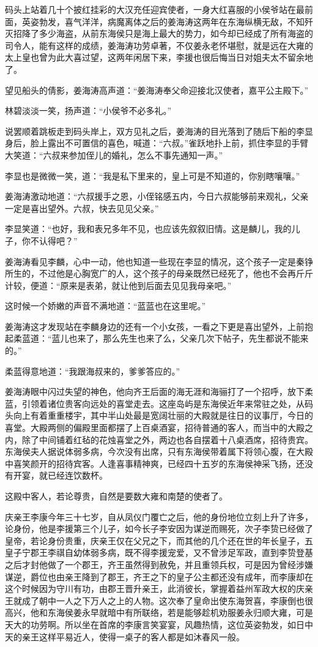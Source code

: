 码头上站着几十个披红挂彩的大汉充任迎宾使者，一身大红喜服的小侯爷站在最前面，英姿勃发，喜气洋洋，病魔离体之后的姜海涛这两年在东海纵横无敌，不知歼灭招降了多少海盗，从前东海侯只是海上最大的势力，如今却已经成了所有海盗的司令人，能有这样的成绩，姜海涛功劳卓著，不仅姜永老怀堪慰，就是远在大雍的太上皇也曾为此大喜过望，这两年闲居下来，李援也很后悔当日对姐夫太不留余地了。

望见船头的倩影，姜海涛高声道：“姜海涛奉父命迎接北汉使者，嘉平公主殿下。”

林碧淡淡一笑，扬声道：“小侯爷不必多礼。”

说罢顺着跳板走到码头岸上，双方见礼之后，姜海涛的目光落到了随后下船的李显身后，脸上露出不可置信的喜色，喊道：“六叔。”雀跃地扑上前，抓住李显的手臂大笑道：“六叔来参加侄儿的婚礼，怎么不事先通知一声。”

李显也是微微一笑，道：“我是私下里来的，皇上可是不知道的，你别瞎嚷嚷。”

姜海涛激动地道：“六叔援手之恩，小侄铭感五内，今日六叔能够前来观礼，父亲一定是喜出望外。六叔，快去见见父亲。”

李显笑道：“也好，我和表兄多年不见，也应该先叙叙旧情。这是麟儿，我的儿子，你不认得吧？”

姜海涛看见李麟，心中一动，他也知道一些现在李显的情况，这个孩子一定是秦铮所生的，不过他是心胸宽广的人，这个孩子的母亲既然已经死了，他也不会再斤斤计较，便道：“原来是表弟，就让他到后面去见见我母亲吧。”

这时候一个娇嫩的声音不满地道：“蓝蓝也在这里呢。”

姜海涛这才发现站在李麟身边的还有一个小女孩，一看之下更是喜出望外，上前抱起柔蓝道：“蓝儿也来了，那么先生也来了么，父亲几次下帖子，先生都说不能来的。”

柔蓝得意地道：“我跟海叔来的，爹爹答应的。”

姜海涛眼中闪过失望的神色，他向齐王后面的海无涯和海骊打了一个招呼，放下柔蓝，引领着诸位贵客向远处的喜堂走去。这座岛屿是东海侯近年来常驻之处，从码头向上有着重重楼宇，其中半山处最是宽阔壮丽的大殿就是往日的议事厅，今日的喜堂。大殿两侧的偏殿里面都摆了上百桌酒宴，招待普通的客人，而当中的大殿之内，除了中间铺着红毡的花烛喜堂之外，两边也各自摆着十八桌酒席，招待贵宾。东海侯夫人据说体弱多病，今次没有出席，只有东海侯带着属下将领心腹，在大殿中喜笑颜开的招待宾客。人逢喜事精神爽，已经四十五岁的东海侯神采飞扬，还没有开宴，就已经连饮数杯。

这殿中客人，若论尊贵，自然是要数大雍和南楚的使者了。

庆亲王李康今年三十七岁，自从凤仪门覆亡之后，他的身份地位立刻上升了许多，论身份，他是李援第三个儿子，如今长子李安因为谋逆而赐死，次子李贽已经做了皇帝，若论身份贵重，庆亲王仅在父兄之下，而其他的几个还在世的年长皇子，五皇子宁郡王李祺自幼体弱多病，既不得李援宠爱，又不曾涉足军政，直到李贽登基之后才封他做了一个郡王，齐王虽然得到赦免，并且重领兵权，可是因为曾经涉嫌谋逆，爵位也由亲王降到了郡王，齐王之下的皇子公主都还没有成年，而李康却在这个时候因为守川有功，由郡王晋升亲王，此消彼长，掌握着益州军政大权的庆亲王就成了朝中一人之下万人之上的人物。这次奉了皇命出使东海贺喜，李康倒也很高兴，他和东海侯姜永早就暗中有所联络，若是能够趁机劝服姜永归顺大雍，可是天大的功劳啊。所以坐在首席的李康言笑宴宴，风趣热情，这位英姿勃发，如日中天的亲王这样平易近人，使得一桌子的客人都是如沐春风一般。

